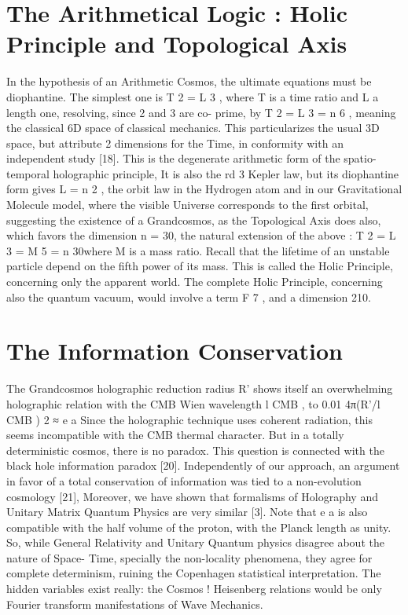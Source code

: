 \section {The Arithmetical Logic : Holic Principle and Topological Axis}

In the hypothesis of an Arithmetic Cosmos, the ultimate equations must be diophantine. The
simplest one is T 2 = L 3 , where T is a time ratio and L a length one, resolving, since 2 and 3 are co-
prime, by T 2 = L 3 = n 6 , meaning the classical 6D space of classical mechanics. This particularizes
the usual 3D space, but attribute 2 dimensions for the Time, in conformity with an independent
study [18].
This is the degenerate arithmetic form of the spatio-temporal holographic principle, It is also the
rd
3 Kepler law, but its diophantine form gives L = n 2 , the orbit law in the Hydrogen atom and in our
Gravitational Molecule model, where the visible Universe corresponds to the first orbital,
suggesting the existence of a Grandcosmos, as the Topological Axis does also, which favors the
dimension n = 30, the natural extension of the above :
T 2 = L 3 = M 5 = n 30where M is a mass ratio. Recall that the lifetime of an unstable particle depend on the fifth power of
its mass. This is called the Holic Principle, concerning only the apparent world. The complete Holic
Principle, concerning also the quantum vacuum, would involve a term F 7 , and a dimension 210.

\section {The Information Conservation}

The Grandcosmos holographic reduction radius R' shows itself an overwhelming holographic
relation with the CMB Wien wavelength l CMB , to 0.01 %
4π(R'/l CMB ) 2 ≈ e a
Since the holographic technique uses coherent radiation, this seems incompatible with the CMB
thermal character. But in a totally deterministic cosmos, there is no paradox. This question is
connected with the black hole information paradox [20]. Independently of our approach, an
argument in favor of a total conservation of information was tied to a non-evolution cosmology
[21], Moreover, we have shown that formalisms of Holography and Unitary Matrix Quantum
Physics are very similar [3]. Note that e a is also compatible with the half volume of the proton, with
the Planck length as unity.
So, while General Relativity and Unitary Quantum physics disagree about the nature of Space-
Time, specially the non-locality phenomena, they agree for complete determinism, ruining the
Copenhagen statistical interpretation. The hidden variables exist really: the Cosmos ! Heisenberg
relations would be only Fourier transform manifestations of Wave Mechanics.


